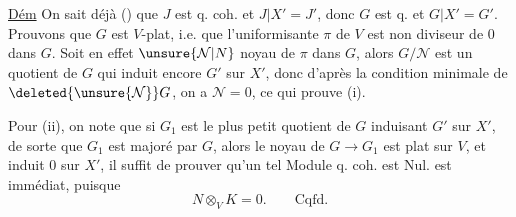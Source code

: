 \uline{Dém} On sait déjà () que $J$ est
q. coh. et $J\vert{}X'=J'$, donc $G$ est q. 
et $G|X'=G'$. Prouvons que $G$ est $V$-plat,
i.e. que l'uniformisante $\pi$ de $V$ est
non diviseur de $0$ dans $G$. 
Soit en effet  $\unsure{\mathcal N|N}$  noyau
de $\pi$ dans $G$, alors $G/\mathcal N$ est un
 quotient  de $G$ qui induit
encore $G'$ sur $X'$, donc d'après la
condition minimale de $\deleted{\unsure{\mathcal N}}G$,  on a $\mathcal N=0$,
ce qui prouve (i).

Pour (ii), on note que si
$G_1$ est le plus petit  quotient
de $G$ induisant $G'$ sur $X'$, 
de sorte que $G_1$ est  majoré par $G$,
alors le noyau de  $G\to G_1$ est  plat sur $V$,
et induit $0$ sur $X'$, il suffit de
prouver qu'un tel Module q. coh. est
Nul.  est immédiat, puisque
\[
N\otimes_V K=0.\qquad \text{Cqfd.}
\]

